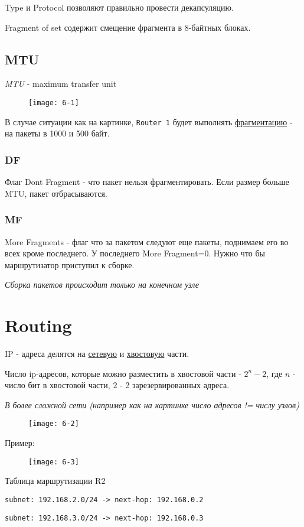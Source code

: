 \documentclass[a4paper,10pt]{article}
\begin{document}
	Type и Protocol позволяют правильно провести декапсуляцию.
	
	Fragment of set содержит смещение фрагмента в 8-байтных блоках.
	
	\subsection{MTU}
	\emph{MTU} - maximum transfer unit
	
	\begin{figure}[h]
		\texttt{[image: 6-1]}
	\end{figure}

	В случае ситуации как на картинке, \texttt{Router 1} будет выполнять \underline{фрагментацию} - на пакеты в 1000 и 500 байт.
	
	\subsubsection{DF}
	Флаг Dont Fragment - что пакет нельзя фрагментировать. Если размер больше MTU, пакет отбрасываются.
	\subsubsection{MF}
	More Fragments - флаг что за пакетом следуют еще пакеты, поднимаем его во всех кроме последнего. У последнего More Fragment=0. Нужно что бы маршрутизатор приступил к сборке.
	
	\textit{Сборка пакетов происходит только на конечном узле}
	\newpage
	\section{Routing}
	IP - адреса делятся на \underline{сетевую} и \underline{хвостовую} части.
	
	Число ip-адресов, которые можно разместить в хвостовой части - $ 2^n-2 $, где $ n $ - число бит в хвостовой части, $ 2 $ - 2 зарезервированных адреса.
	
	\textit{В более сложной сети (например как на картинке число адресов != числу узлов)}
	
	\begin{figure}[h]
		\texttt{[image: 6-2]}
	\end{figure}
	
	Пример:
	
	\begin{figure}[h]
		\texttt{[image: 6-3]}
	\end{figure}

	Таблица маршрутизации R2
	
	\texttt{subnet: 192.168.2.0/24 -> next-hop: 192.168.0.2}
	
	\texttt{subnet: 192.168.3.0/24 -> next-hop: 192.168.0.3}
\end{document}
